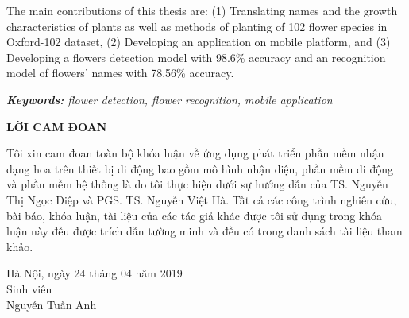 \documentclass[12pt]{report}
\begin{document}
		The main contributions of this thesis are: (1) Translating names and the growth characteristics of plants as well as methods of planting of 102 flower species in Oxford-102 dataset, (2) Developing an application on mobile platform, and (3) Developing a flowers detection model with 98.6\% accuracy and an recognition model of flowers' names with 78.56\% accuracy.
																																																																										
																																																																										
		\noindent \textit{\textbf{Keywords:} flower detection, flower recognition, mobile application}
																																																																										
		\newpage
		\begin{center}
			\textbf{\large LỜI CAM ĐOAN}
		\end{center}
		Tôi xin cam đoan toàn bộ khóa luận về ứng dụng phát triển phần mềm nhận dạng hoa trên thiết bị di động bao gồm mô hình nhận diện, phần mềm di động và phần mềm hệ thống là do tôi thực hiện dưới sự hướng dẫn của TS. Nguyễn Thị Ngọc Diệp và PGS. TS. Nguyễn Việt Hà. Tất cả các công trình nghiên cứu, bài báo, khóa luận, tài liệu của các tác giả khác được tôi sử dụng trong khóa luận này đều được trích dẫn tường minh và đều có trong danh sách tài liệu tham khảo.
																																																																										
		\begin{flushright}
			\begin{varwidth}{\linewidth}\centering
				Hà Nội, ngày 24 tháng 04 năm 2019\\
				Sinh viên\\[2cm]
				Nguyễn Tuấn Anh
			\end{varwidth}
		\end{flushright}
																																																																										
		\newpage
		\tableofcontents
																																																																										
		\newpage
		\listoftables
																																																																										
\end{document}

